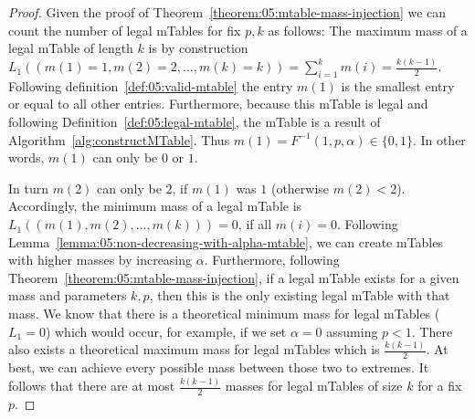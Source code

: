 \begin{proof}
	\label{proof:05:number-of-mtables}
	Given the proof of Theorem~\ref{theorem:05:mtable-mass-injection} we can count the number of legal mTables for fix $p,k$ as follows: The maximum mass of a legal mTable of length $k$ is by construction
	$L_1 ((m(1) = 1,m(2) = 2, \ldots, m(k) = k)) = \sum_{i=1}^k m(i) = \frac{k(k-1)}{2}$.
	Following definition~\ref{def:05:valid-mtable} the 	    entry $m(1)$ is the smallest entry or equal to all other entries.
	Furthermore, because this mTable is legal and following Definition~\ref{def:05:legal-mtable}, the mTable is a result of Algorithm~\ref{alg:constructMTable}.
	Thus $m(1) = F^{-1}(1,p,\alpha) \in \lbrace 0,1\rbrace$. In other words, $m(1)$ can only be $0$ or $1$.

	In turn $m(2)$ can only be $2$, if $m(1)$ was $1$ (otherwise $m(2)<2$).
	Accordingly, the minimum mass of a legal mTable is $L_1((m(1),m(2), \ldots, m(k))) = 0$, if all $m(i)=0$.
	Following Lemma~\ref{lemma:05:non-decreasing-with-alpha-mtable}, we can create mTables with higher masses by increasing $\alpha$.
	Furthermore, following Theorem~\ref{theorem:05:mtable-mass-injection}, if a legal mTable exists for a given mass and parameters $k,p$, then this is the only existing legal mTable with that mass.
	We know that there is a theoretical minimum mass for legal mTables ($L_1 =0$) which would occur, for example, if we set $\alpha = 0$ assuming $p<1$.
	There also exists a theoretical maximum mass for legal mTables which is $\frac{k(k-1)}{2}$.
	At best, we can achieve every possible mass between those two to extremes.
	It follows that there are at most $\frac{k(k-1)}{2}$ masses for legal mTables of size $k$ for a fix~$p$.
\end{proof}
%
